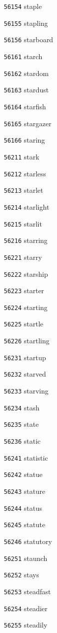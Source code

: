 \documentclass[twoside,11pt]{article}
\begin{document}
\begin{multicols}{5}
\begin{enumerate}
\item[\texttt{56154}] staple
\item[\texttt{56155}] stapling
\item[\texttt{56156}] starboard
\item[\texttt{56161}] starch
\item[\texttt{56162}] stardom
\item[\texttt{56163}] stardust
\item[\texttt{56164}] starfish
\item[\texttt{56165}] stargazer
\item[\texttt{56166}] staring
\item[\texttt{56211}] stark
\item[\texttt{56212}] starless
\item[\texttt{56213}] starlet
\item[\texttt{56214}] starlight
\item[\texttt{56215}] starlit
\item[\texttt{56216}] starring
\item[\texttt{56221}] starry
\item[\texttt{56222}] starship
\item[\texttt{56223}] starter
\item[\texttt{56224}] starting
\item[\texttt{56225}] startle
\item[\texttt{56226}] startling
\item[\texttt{56231}] startup
\item[\texttt{56232}] starved
\item[\texttt{56233}] starving
\item[\texttt{56234}] stash
\item[\texttt{56235}] state
\item[\texttt{56236}] static
\item[\texttt{56241}] statistic
\item[\texttt{56242}] statue
\item[\texttt{56243}] stature
\item[\texttt{56244}] status
\item[\texttt{56245}] statute
\item[\texttt{56246}] statutory
\item[\texttt{56251}] staunch
\item[\texttt{56252}] stays
\item[\texttt{56253}] steadfast
\item[\texttt{56254}] steadier
\item[\texttt{56255}] steadily

\end{enumerate}
\end{multicols}
\end{document}
